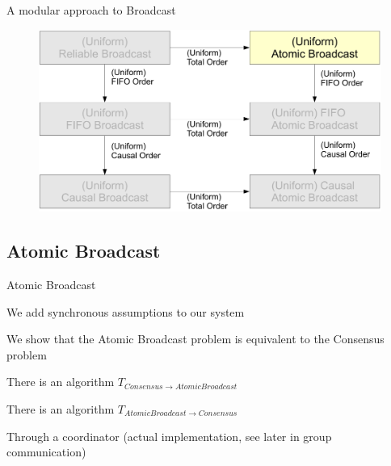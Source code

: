 \begin{frame}{A modular approach to Broadcast}

\begin{figure}
	\includegraphics[width=\textwidth]{figs/04/rb-modular-summary}
\end{figure}

\end{frame}

\subsection{Atomic Broadcast}

\begin{frame}{Atomic Broadcast}
	

\BEL
\item We add synchronous assumptions to our system
\item  We show that the Atomic Broadcast problem is \alert{equivalent} to the Consensus problem
\BI
\item There is an algorithm $T_{\mathit{Consensus} \rightarrow \mathit{Atomic Broadcast}}$
\item There is an algorithm $T_{\mathit{Atomic Broadcast} \rightarrow \mathit{Consensus}}$
\EI
\item Through a coordinator  (actual implementation, see later in group communication)
\EEL

\end{frame}


